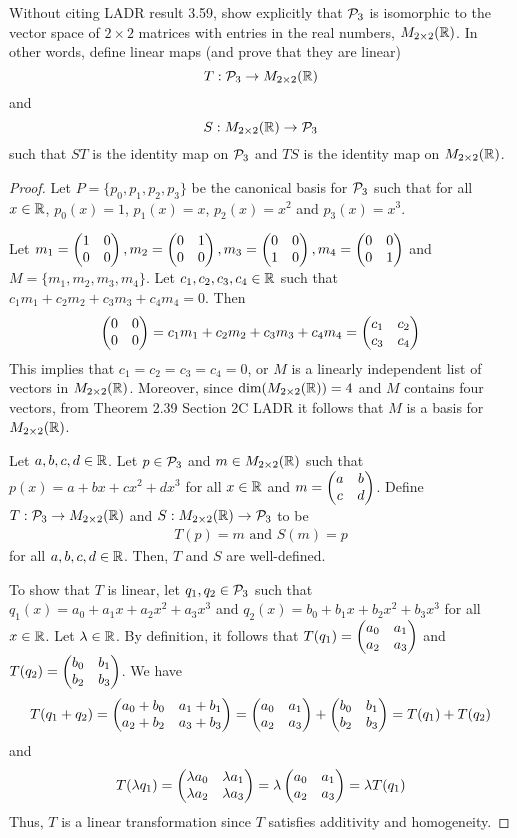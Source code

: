 \begin{question}
\normalfont
\noindent Without citing LADR result 3.59, show explicitly that  $\P_3$ is isomorphic to the vector space of $2\times2$ matrices with entries in the real numbers, $M_{2\times 2}(\real)$. In other words, define linear maps (and prove that they are linear)
\[
T: \P_3 \to M_{2\times2}(\real)
\]
and 
\[
S: M_{2\times2}(\real) \to \P_3
\]
such that $ST$ is the identity map on $\P_3$ and $TS$ is the identity map on $M_{2\times2}(\real)$.  \\ 


\end{question}

\begin{proof}
    \renewcommand{\qedsymbol}{$\blacksquare$}
    Let $P=\{p_0,p_1,p_2,p_3\}$ be the canonical basis for $\P_3$ such that for all $x\in\R$, $p_0(x)=1$, $p_1(x)=x$, $p_2(x)=x^2$ and $p_3(x)=x^3$.

    Let $m_1=\MatTwoTwo{1}{0}{0}{0},m_2=\MatTwoTwo{0}{1}{0}{0},m_3=\MatTwoTwo{0}{0}{1}{0},m_4=\MatTwoTwo{0}{0}{0}{1}$ and\\
    $M=\{m_1,m_2,m_3,m_4\}$. Let $c_1,c_2,c_3,c_4\in\R$ such that $c_1m_1+c_2m_2+c_3m_3+c_4m_4=0$. Then 
    \[
        \begin{aligned}
            \MatTwoTwo{0}{0}{0}{0} 
            = c_1m_1+c_2m_2+c_3m_3+c_4m_4
            = \MatTwoTwo{c_1}{c_2}{c_3}{c_4}
        \end{aligned}
    \]
    This implies that $c_1=c_2=c_3=c_4=0$, or $M$ is a linearly independent list of vectors in $M_{2\times 2}(\R)$.
    Moreover, since $\dim(M_{2\times 2}(\R))=4$ and $M$ contains four vectors, from Theorem 2.39 Section 2C LADR it follows that $M$ is a basis for $M_{2\times 2}(\R)$.
    
    Let $a,b,c,d\in\R$. 
    Let $p\in\P_3$ and $m\in M_{2\times 2}(\R)$ such that $p(x)=a+bx+cx^2+dx^3$ for all $x\in\R$ and $m=\MatTwoTwo{a}{b}{c}{d}$.
    Define $T:\P_3\to M_{2\times 2}(\R)$ and $S:M_{2\times 2}(\R)\to\P_3$ to be
    \[
        \begin{aligned}
            T(p)=m \text{ and } S(m)=p
        \end{aligned}
    \]
    for all $a,b,c,d\in\R$. Then, $T$ and $S$ are well-defined.

    To show that $T$ is linear, let $q_1,q_2\in\P_3$ such that
    $q_1(x)=a_0+a_1x+a_2x^2+a_3x^3$ and $q_2(x)=b_0+b_1x+b_2x^2+b_3x^3$ for all $x\in\R$.
    Let $\lambda\in\R$.
    By definition, it follows that $T(q_1)=\MatTwoTwo{a_0}{a_1}{a_2}{a_3}$ and $T(q_2)=\MatTwoTwo{b_0}{b_1}{b_2}{b_3}$.
    We have 
    \[
        \begin{aligned}
            T(q_1+q_2)=\MatTwoTwo{a_0+b_0}{a_1+b_1}{a_2+b_2}{a_3+b_3}=\MatTwoTwo{a_0}{a_1}{a_2}{a_3}+\MatTwoTwo{b_0}{b_1}{b_2}{b_3}=T(q_1)+T(q_2)
        \end{aligned}
    \]
    and 
    \[
        \begin{aligned}
            T(\lambda q_1)=\MatTwoTwo{\lambda a_0}{\lambda a_1}{\lambda a_2}{\lambda a_3}=\lambda \MatTwoTwo{a_0}{a_1}{a_2}{a_3}=\lambda T(q_1)
        \end{aligned}
    \]
    Thus, $T$ is a linear transformation since $T$ satisfies additivity and homogeneity.


\end{proof}
